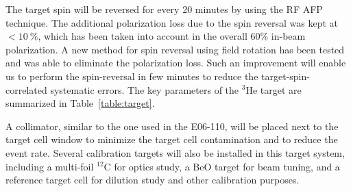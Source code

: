 The target spin will be reversed for every 20 minutes by using the RF AFP
technique. The additional polarization loss due to the spin reversal was kept
at $<10~\%$, which has been taken into account in the overall 60\% in-beam
polarization. A new method for spin reversal using field rotation has been
tested and was able to eliminate the polarization loss. Such an improvement
will enable us to perform the spin-reversal in few minutes to reduce the
target-spin-correlated systematic errors. The key parameters of the
$\mathrm{^{3}He}$ target are summarized in Table~\ref{table:target}.
  
A collimator, similar to the one used in the E06-110, will be placed next to
the target cell window to minimize the target cell contamination and to reduce
the event rate. Several calibration targets will also be installed in this
target system, including a multi-foil $^{12}$C for optics study, a BeO target
for beam tuning, and a reference target cell for dilution study and other
calibration purposes.
  
